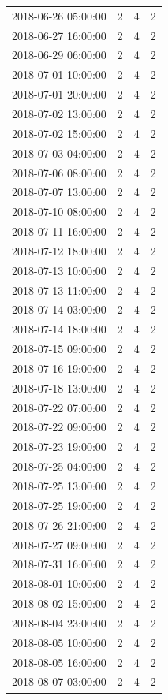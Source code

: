 \begin{tabular}{lrrr}
2018-06-26 05:00:00 & 2 & 4 & 2 \\
2018-06-27 16:00:00 & 2 & 4 & 2 \\
2018-06-29 06:00:00 & 2 & 4 & 2 \\
2018-07-01 10:00:00 & 2 & 4 & 2 \\
2018-07-01 20:00:00 & 2 & 4 & 2 \\
2018-07-02 13:00:00 & 2 & 4 & 2 \\
2018-07-02 15:00:00 & 2 & 4 & 2 \\
2018-07-03 04:00:00 & 2 & 4 & 2 \\
2018-07-06 08:00:00 & 2 & 4 & 2 \\
2018-07-07 13:00:00 & 2 & 4 & 2 \\
2018-07-10 08:00:00 & 2 & 4 & 2 \\
2018-07-11 16:00:00 & 2 & 4 & 2 \\
2018-07-12 18:00:00 & 2 & 4 & 2 \\
2018-07-13 10:00:00 & 2 & 4 & 2 \\
2018-07-13 11:00:00 & 2 & 4 & 2 \\
2018-07-14 03:00:00 & 2 & 4 & 2 \\
2018-07-14 18:00:00 & 2 & 4 & 2 \\
2018-07-15 09:00:00 & 2 & 4 & 2 \\
2018-07-16 19:00:00 & 2 & 4 & 2 \\
2018-07-18 13:00:00 & 2 & 4 & 2 \\
2018-07-22 07:00:00 & 2 & 4 & 2 \\
2018-07-22 09:00:00 & 2 & 4 & 2 \\
2018-07-23 19:00:00 & 2 & 4 & 2 \\
2018-07-25 04:00:00 & 2 & 4 & 2 \\
2018-07-25 13:00:00 & 2 & 4 & 2 \\
2018-07-25 19:00:00 & 2 & 4 & 2 \\
2018-07-26 21:00:00 & 2 & 4 & 2 \\
2018-07-27 09:00:00 & 2 & 4 & 2 \\
2018-07-31 16:00:00 & 2 & 4 & 2 \\
2018-08-01 10:00:00 & 2 & 4 & 2 \\
2018-08-02 15:00:00 & 2 & 4 & 2 \\
2018-08-04 23:00:00 & 2 & 4 & 2 \\
2018-08-05 10:00:00 & 2 & 4 & 2 \\
2018-08-05 16:00:00 & 2 & 4 & 2 \\
2018-08-07 03:00:00 & 2 & 4 & 2 \\

\end{tabular}
